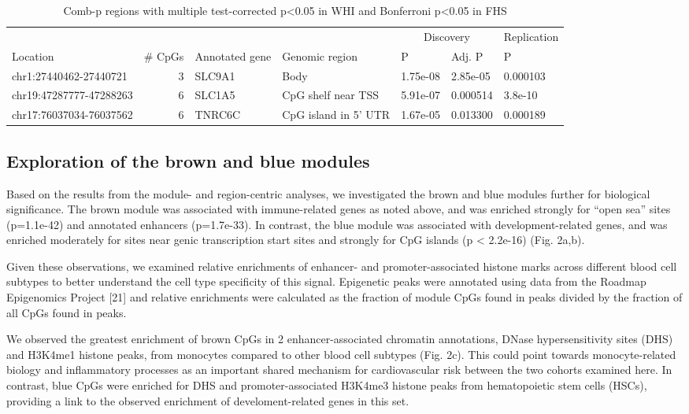 \documentclass[]{article}
\theoremstyle{definition}
\theoremstyle{definition}
\theoremstyle{definition}
\theoremstyle{remark}
\begin{document}
\begin{table}[H]
\caption{\label{tab:combp-results}Comb-p regions with multiple test-corrected p<0.05 in WHI and Bonferroni p<0.05 in FHS}
\centering
\begin{tabular}[t]{lrlllll}
\toprule
\multicolumn{1}{c}{} & \multicolumn{1}{c}{} & \multicolumn{1}{c}{} & \multicolumn{1}{c}{} & \multicolumn{2}{c}{Discovery} & \multicolumn{1}{c}{Replication} \\
\cmidrule(l{2pt}r{2pt}){5-6} \cmidrule(l{2pt}r{2pt}){7-7}
Location & \# CpGs & Annotated gene & Genomic region & P & Adj. P & P\\
\midrule
chr1:27440462-27440721 & 3 & SLC9A1 & Body & 1.75e-08 & 2.85e-05 & 0.000103\\
chr19:47287777-47288263 & 6 & SLC1A5 & CpG shelf near TSS & 5.91e-07 & 0.000514 & 3.8e-10\\
chr17:76037034-76037562 & 6 & TNRC6C & CpG island in 5' UTR & 1.67e-05 & 0.013300 & 0.000189\\
\bottomrule
\end{tabular}
\end{table}

\subsection{Exploration of the brown and blue
modules}\label{exploration-of-the-brown-and-blue-modules}

Based on the results from the module- and region-centric analyses, we
investigated the brown and blue modules further for biological
significance. The brown module was associated with immune-related genes
as noted above, and was enriched strongly for ``open sea'' sites
(p=1.1e-42) and annotated enhancers (p=1.7e-33). In contrast, the blue
module was associated with development-related genes, and was enriched
moderately for sites near genic transcription start sites and strongly
for CpG islands (p \textless{} 2.2e-16) (Fig. 2a,b).

Given these observations, we examined relative enrichments of enhancer-
and promoter-associated histone marks across different blood cell
subtypes to better understand the cell type specificity of this signal.
Epigenetic peaks were annotated using data from the Roadmap Epigenomics
Project {[}21{]} and relative enrichments were calculated as the
fraction of module CpGs found in peaks divided by the fraction of all
CpGs found in peaks.

We observed the greatest enrichment of brown CpGs in 2
enhancer-associated chromatin annotations, DNase hypersensitivity sites
(DHS) and H3K4me1 histone peaks, from monocytes compared to other blood
cell subtypes (Fig. 2c). This could point towards monocyte-related
biology and inflammatory processes as an important shared mechanism for
cardiovascular risk between the two cohorts examined here. In contrast,
blue CpGs were enriched for DHS and promoter-associated H3K4me3 histone
peaks from hematopoietic stem cells (HSCs), providing a link to the
observed enrichment of develoment-related genes in this set.
\end{document}

